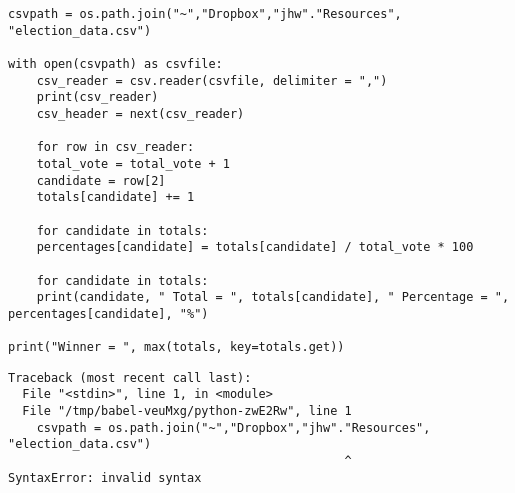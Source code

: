 \documentclass[11pt]{article}
\begin{document}
\begin{verbatim}
csvpath = os.path.join("~","Dropbox","jhw"."Resources", "election_data.csv")  

with open(csvpath) as csvfile:
    csv_reader = csv.reader(csvfile, delimiter = ",")
    print(csv_reader)
    csv_header = next(csv_reader)

    for row in csv_reader:
	total_vote = total_vote + 1
	candidate = row[2]
	totals[candidate] += 1

    for candidate in totals:
	percentages[candidate] = totals[candidate] / total_vote * 100

    for candidate in totals:
	print(candidate, " Total = ", totals[candidate], " Percentage = ", percentages[candidate], "%")

print("Winner = ", max(totals, key=totals.get))
\end{verbatim}

\begin{verbatim}
Traceback (most recent call last):
  File "<stdin>", line 1, in <module>
  File "/tmp/babel-veuMxg/python-zwE2Rw", line 1
    csvpath = os.path.join("~","Dropbox","jhw"."Resources", "election_data.csv")  
                                               ^
SyntaxError: invalid syntax


\end{verbatim}
\end{document}
